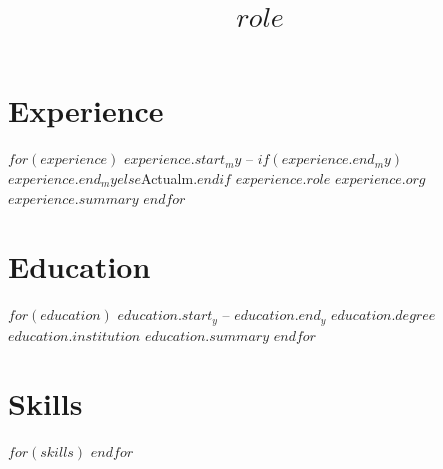 \documentclass[11pt,a4paper,sans]{moderncv}
\title{$role$}
\begin{document}
\makecvtitle

\section{Experience}
$for(experience)$
\cventry
  {$experience.start_my$ -- $if(experience.end_my)$$experience.end_my$$else$Actualm.$endif$}
  {$experience.role$}
  {$experience.org$}
  {}
  {}
  {$experience.summary$}
$endfor$

\newpage
\section{Education}
$for(education)$
\cventry
  {$education.start_y$ -- $education.end_y$}
  {$education.degree$}
  {$education.institution$}
  {}
  {}
  {$education.summary$}
$endfor$

\section{Skills}
$for(skills)$
$endfor$
\end{document}
